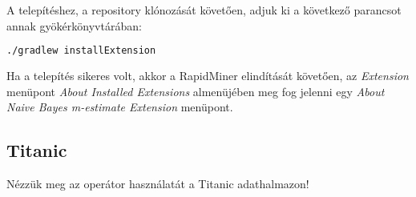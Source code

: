 \documentclass[a4paper]{article}
\begin{document}
A telepítéshez, a repository klónozását követően, adjuk ki a következő parancsot annak gyökérkönyvtárában:

\begin{lstlisting}[language=bash, caption={Az operátor telepítése.}, captionpos=b, escapechar=$]
./gradlew installExtension
\end{lstlisting}

Ha a telepítés sikeres volt, akkor a RapidMiner elindítását követően, az \textit{Extension} menüpont \textit{About Installed Extensions} almenüjében meg fog jelenni egy \textit{About Naive Bayes m-estimate Extension} menüpont.

\pagebreak

\subsection{Titanic}

Nézzük meg az operátor használatát a Titanic adathalmazon! 
\end{document}

